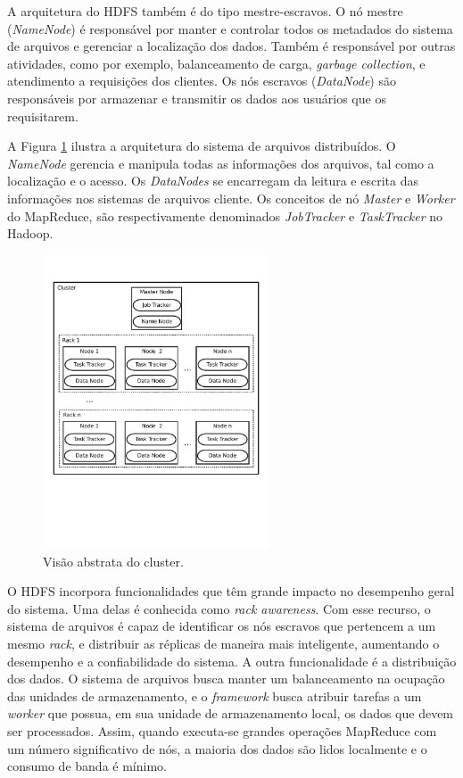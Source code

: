 A arquitetura do HDFS também é do tipo mestre-escravos.
O nó mestre (\textit{NameNode}) é responsável por manter e controlar todos os metadados do sistema de arquivos e gerenciar a localização dos dados. Também é responsável por outras atividades, como por exemplo, balanceamento de carga, \textit{garbage collection}, e atendimento a requisições dos clientes.
Os nós escravos (\textit{DataNode}) são responsáveis por armazenar e transmitir os dados aos usuários que os requisitarem.

A Figura \ref{fig:hdfs} ilustra a arquitetura do sistema de arquivos distribuídos.
O \textit{NameNode} gerencia e manipula todas as informações dos arquivos, tal como a localização e o acesso. Os \textit{DataNodes} se encarregam da leitura e escrita das informações nos sistemas de arquivos cliente. Os conceitos de nó \textit{Master} e \textit{Worker} do MapReduce, são respectivamente denominados \textit{JobTracker} e \textit{TaskTracker} no Hadoop.
\begin{figure}[htb]
\centering
\includegraphics[trim=0cm 6cm 0cm 2cm, width=0.6\textwidth]{figuras/HadoopCluster.pdf}
\caption{Visão abstrata do cluster.}
\label{fig:hdfs}
\end{figure}

O HDFS incorpora funcionalidades que têm grande impacto no desempenho geral do sistema.
Uma delas é conhecida como \textit{rack awareness}. Com esse recurso, o sistema de arquivos é capaz de identificar os nós escravos que pertencem a um mesmo \textit{rack}, e distribuir as réplicas de maneira mais inteligente, aumentando o desempenho e a confiabilidade do sistema.
A outra funcionalidade é a distribuição dos dados. O sistema de arquivos busca manter um balanceamento na ocupação das unidades de armazenamento, e o \textit{framework} busca atribuir tarefas a um \textit{worker} que possua, em sua unidade de armazenamento local, os dados que devem ser processados.
Assim, quando executa-se grandes operações MapReduce com um número significativo de nós, a maioria dos dados são lidos localmente e o consumo de banda é mínimo.



